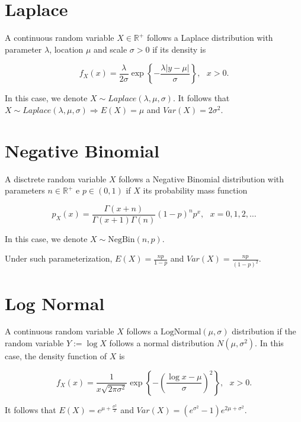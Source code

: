 \section{Laplace}

A continuous random variable $X \in \mathbb{R}^+$ follows a Laplace distribution with parameter $\lambda$, location $\mu$ and scale $\sigma>0$ if its density is


$$ f_X(x) = \frac{\lambda}{2\sigma}\exp\left\{ -\frac{\lambda |y - \mu |}{\sigma} \right\}, \ \ \ x > 0.$$

In this case, we denote $X \sim Laplace(\lambda, \mu, \sigma).$ It follows that $X \sim Laplace(\lambda, \mu, \sigma) \Rightarrow E(X) = \mu$ and $Var(X) = 2\sigma^2.$


\section{Negative Binomial}

A disctrete random variable $X$ follows a Negative Binomial distribution with parameters $n\in \mathbb{R}^{+}$ e $p \in (0,1)$ if $X$ its probability mass function

$$p_X(x)=\frac{\Gamma(x+n)}{\Gamma(x+1)\Gamma(n)}(1-p)^n p^x, \ \ \ x=0, 1, 2, \ldots$$

In this case, we denote $X\sim \mbox{NegBin}(n, p)$.

Under such parameterization, $E(X)=\frac{n p}{1-p}$ and $Var(X)=\frac{n p}{(1-p)^2}$.

\section{Log Normal}

A continuous random variable $X$ follows a $\mbox{LogNormal}(\mu, \sigma)$ distribution if the random variable $Y:=\log X$ follows a normal distribution $N(\mu, \sigma^2)$. In this case, the density function of $X$ is

$$f_X(x)=\frac{1}{x\sqrt{2\pi\sigma^2}}\exp\left\{-\left(\frac{\log x- \mu}{\sigma}\right)^2\right\}, \ \ \ x>0.$$

It follows that $E(X)=e^{\mu+\frac{\sigma^2}{2}}$ and $Var(X)=(e^{\sigma^2}-1)e^{2\mu+\sigma^2}$.
